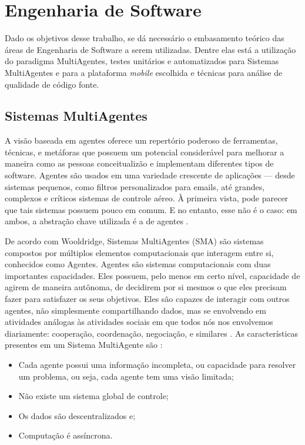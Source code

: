 \section{Engenharia de Software}

Dado os objetivos desse trabalho, se dá necessário o embasamento teórico das áreas de Engenharia de Software a serem utilizadas. Dentre elas está a utilização do paradigma MultiAgentes, testes unitários e automatizados para Sistemas MultiAgentes e para a plataforma \textit{mobile} escolhida e técnicas para análise de qualidade de código fonte.

  \subsection{Sistemas MultiAgentes}

A visão baseada em agentes oferece um repertório poderoso de ferramentas, técnicas, e metáforas que possuem um potencial considerável para melhorar a maneira como as pessoas conceitualizão e implementam diferentes tipos de software. Agentes são usados em uma variedade crescente de aplicações — desde sistemas pequenos, como filtros personalizados para emails, até grandes, complexos e críticos sistemas de controle aéreo. À primeira vista, pode parecer que tais sistemas possuem pouco em comum. E no entanto, esse não é o caso: em ambos, a abstração chave utilizada é a de agentes \cite{jennings1998}.

De acordo com Wooldridge, Sistemas MultiAgentes (SMA) são sistemas compostos por múltiplos elementos computacionais que interagem entre si, conhecidos como Agentes. Agentes são sistemas computacionais com duas importantes capacidades. Eles possuem, pelo menos em certo nível, capacidade de agirem de maneira autônoma, de decidirem por si mesmos o que eles precisam fazer para satisfazer os seus objetivos. Eles são capazes de interagir com outros agentes, não simplesmente compartilhando dados,  mas se envolvendo em atividades análogas às atividades sociais em que todos nós nos envolvemos diariamente: cooperação, coordenação, negociação, e similares \cite{wooldridge2009}. As características presentes em um Sistema MultiAgente são  \cite{jennings1998}:

\begin{itemize}
  \item Cada agente possui uma informação incompleta, ou capacidade para resolver um problema, ou seja, cada agente tem uma visão limitada;
  \item Não existe um sistema global de controle;
  \item Os dados são descentralizados e;
  \item Computação é assíncrona.
\end{itemize}

